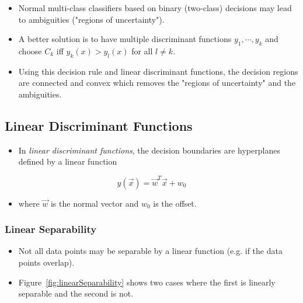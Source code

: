 			\begin{itemize}
				\item Normal multi-class classifiers based on binary (two-class) decisions may lead to ambiguities ("regions of uncertainty").
				\item A better solution is to have multiple discriminant functions \( y_1, \cdots, y_k \) and choose \( C_k \) iff \( y_k(x) > y_l(x) \) for all \( l \neq k \).
				\item Using this decision rule and linear discriminant functions, the decision regions are connected and convex which removes the "regions of uncertainty" and the ambiguities.
			\end{itemize}

		\subsection{Linear Discriminant Functions}
			\begin{itemize}
				\item In \emph{linear discriminant functions}, the decision boundaries are hyperplanes defined by a linear function
			\end{itemize}
			\begin{equation}
				y(\vec{x}) = \vec{w}^T \vec{x} + w_0
			\end{equation}
			\begin{itemize}
				\item[] where \(\vec{w}\) is the normal vector and \(w_0\) is the offset.
			\end{itemize}

			\subsubsection{Linear Separability}
				\begin{itemize}
					\item Not all data points may be separable by a linear function (e.g. if the data points overlap).
					\item Figure~\ref{fig:linearSeparability} shows two cases where the first is linearly separable and the second is not.
				\end{itemize}

